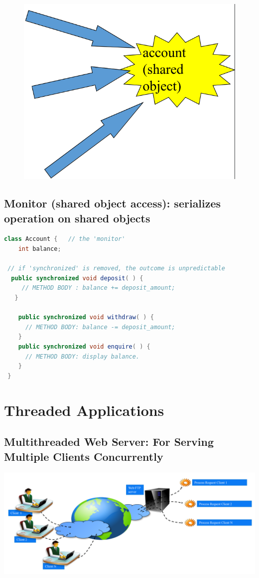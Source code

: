 \documentclass[12pt, a4paper]{book}
\begin{document}
\begin{figure}[!h]
    \centering
    \includegraphics[width=0.3\linewidth]{figures/three-access-one.png}
\end{figure}

\subsection{Monitor (shared object access): serializes operation on shared objects}
\begin{lstlisting}[language=java]
class Account {   // the 'monitor'
    int balance;

 // if 'synchronized' is removed, the outcome is unpredictable
  public synchronized void deposit( ) {
     // METHOD BODY : balance += deposit_amount;
   }

    public synchronized void withdraw( ) {
      // METHOD BODY: balance -= deposit_amount;
    }
    public synchronized void enquire( ) {
      // METHOD BODY: display balance.
    }
 }
\end{lstlisting}

\section{Threaded Applications}
\subsection{Multithreaded Web Server: For Serving Multiple Clients Concurrently}
\includegraphics[width=0.5\linewidth]{figures/Web Server.png}
\end{document}
